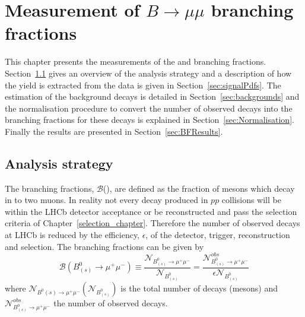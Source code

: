 \chapter{Measurement of $B \to \mu \mu$ branching fractions}
\label{sec:BFanalysis}
This chapter presents the measurements of the \bdmumu and \bsmumu branching fractions. Section~\ref{sec:BFAnalysisStrategy} gives an overview of the analysis strategy and a description of how the \bmumu yield is extracted from the data is given in Section~\ref{sec:signalPdfs}. The estimation of the background decays is detailed in Section~\ref{sec:backgrounds} and the  normalisation procedure to convert the number of observed \bmumu decays into the branching fractions for these decays is explained in Section~\ref{sec:Normalisation}. Finally the results are presented in Section~\ref{sec:BFResults}. 


\section{Analysis strategy} 
\label{sec:BFAnalysisStrategy}
The \bmumu branching fractions, $\mathcal{B}$(\bmumu), are defined as the fraction of \bs mesons which decay in to two muons.
In reality not every \bmumu decay produced in $pp$ collisions will be within the LHCb detector acceptance or be reconstructed and pass the selection criteria of Chapter~\ref{selection_chapter}. Therefore the number of observed \bmumu decays at LHCb is reduced by the efficiency, $\epsilon$, of the detector, trigger, reconstruction and selection.
The \bmumu branching fractions can be given by
\begin{equation}
\mathcal{B}(B^{0}_{(s)} \to \mu^{+} \mu^{-}) \equiv \frac{\mathcal{N}_{B^{0}_{(s)} \to \mu^{+} \mu^{-}}}{\mathcal{N}_{B^{0}_{(s)}}} = \frac{ \mathcal{N}^{obs}_{B^{0}_{(s)} \to \mu^{+} \mu^{-}}}{ \epsilon \mathcal{N}_{B^{0}_{(s)}}}
\label{eq:BFdef}
\end{equation}
where $\mathcal{N}_{B^{0}{(s)} \to \mu^{+} \mu^{-}} (\mathcal{N}_{B^{0}_{(s)}})$ is the total number of \bmumu decays (\bsd mesons) and $\mathcal{N}^{obs}_{B^{0}_{(s)} \to \mu^{+} \mu^{-}}$ the number of observed \bmumu decays.


